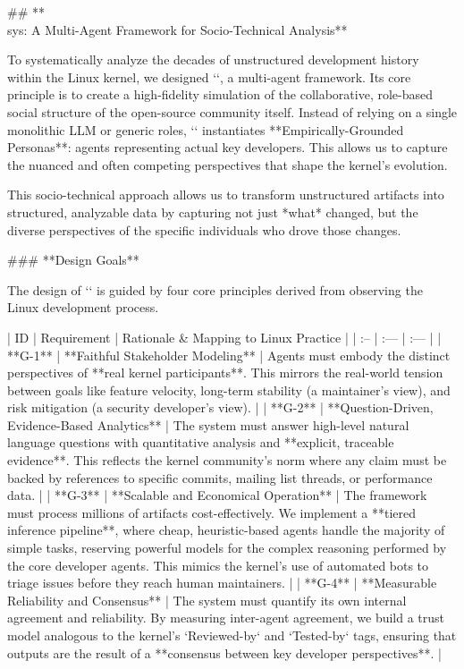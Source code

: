 

## **\\sys: A Multi-Agent Framework for Socio-Technical Analysis**

To systematically analyze the decades of unstructured development history within the Linux kernel, we designed `\sys`, a multi-agent framework. Its core principle is to create a high-fidelity simulation of the collaborative, role-based social structure of the open-source community itself. Instead of relying on a single monolithic LLM or generic roles, `\sys` instantiates **Empirically-Grounded Personas**: agents representing actual key developers. This allows us to capture the nuanced and often competing perspectives that shape the kernel's evolution.

This socio-technical approach allows us to transform unstructured artifacts into structured, analyzable data by capturing not just *what* changed, but the diverse perspectives of the specific individuals who drove those changes.

### **Design Goals**

The design of `\sys` is guided by four core principles derived from observing the Linux development process.

| ID | Requirement | Rationale & Mapping to Linux Practice |
| :-- | :--- | :--- |
| **G-1** | **Faithful Stakeholder Modeling** | Agents must embody the distinct perspectives of **real kernel participants**. This mirrors the real-world tension between goals like feature velocity, long-term stability (a maintainer's view), and risk mitigation (a security developer's view). |
| **G-2** | **Question-Driven, Evidence-Based Analytics** | The system must answer high-level natural language questions with quantitative analysis and **explicit, traceable evidence**. This reflects the kernel community's norm where any claim must be backed by references to specific commits, mailing list threads, or performance data. |
| **G-3** | **Scalable and Economical Operation** | The framework must process millions of artifacts cost-effectively. We implement a **tiered inference pipeline**, where cheap, heuristic-based agents handle the majority of simple tasks, reserving powerful models for the complex reasoning performed by the core developer agents. This mimics the kernel's use of automated bots to triage issues before they reach human maintainers. |
| **G-4** | **Measurable Reliability and Consensus** | The system must quantify its own internal agreement and reliability. By measuring inter-agent agreement, we build a trust model analogous to the kernel's `Reviewed-by` and `Tested-by` tags, ensuring that outputs are the result of a **consensus between key developer perspectives**. |

